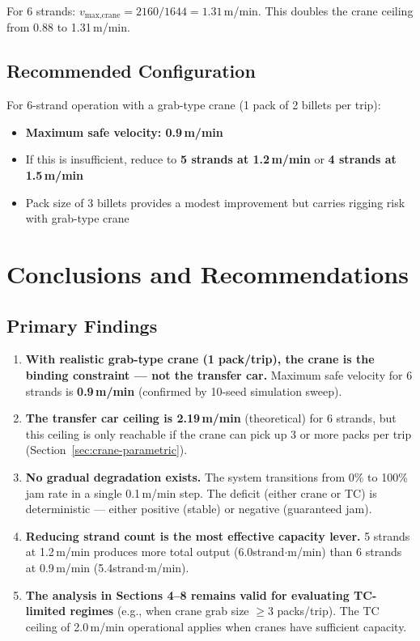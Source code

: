 \documentclass[11pt,a4paper]{article}
\begin{document}
For 6 strands: $v_\text{max,crane} = 2160 / 1644 = 1.31$\,m/min. This doubles the crane ceiling from 0.88 to 1.31\,m/min.

\subsection{Recommended Configuration}

For 6-strand operation with a grab-type crane (1 pack of 2 billets per trip):
\begin{itemize}
    \item \textbf{Maximum safe velocity: 0.9\,m/min}
    \item If this is insufficient, reduce to \textbf{5 strands at 1.2\,m/min} or \textbf{4 strands at 1.5\,m/min}
    \item Pack size of 3 billets provides a modest improvement but carries rigging risk with grab-type crane
\end{itemize}

\section{Conclusions and Recommendations}
\label{sec:conclusions}

\subsection{Primary Findings}

\begin{enumerate}
    \item \textbf{With realistic grab-type crane (1 pack/trip), the crane is the binding constraint --- not the transfer car.} Maximum safe velocity for 6 strands is \textbf{0.9\,m/min} (confirmed by 10-seed simulation sweep).
    \item \textbf{The transfer car ceiling is 2.19\,m/min} (theoretical) for 6 strands, but this ceiling is only reachable if the crane can pick up 3 or more packs per trip (Section~\ref{sec:crane-parametric}).
    \item \textbf{No gradual degradation exists.} The system transitions from 0\% to 100\% jam rate in a single 0.1\,m/min step. The deficit (either crane or TC) is deterministic --- either positive (stable) or negative (guaranteed jam).
    \item \textbf{Reducing strand count is the most effective capacity lever.} 5 strands at 1.2\,m/min produces more total output (6.0\;strand$\cdot$m/min) than 6 strands at 0.9\,m/min (5.4\;strand$\cdot$m/min).
    \item \textbf{The analysis in Sections 4--8 remains valid for evaluating TC-limited regimes} (e.g., when crane grab size $\geq 3$ packs/trip). The TC ceiling of 2.0\,m/min operational applies when cranes have sufficient capacity.
\end{enumerate}
\end{document}
